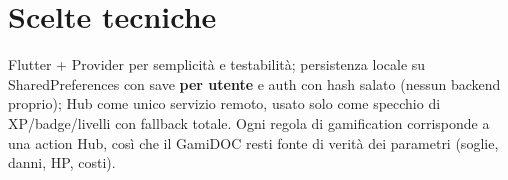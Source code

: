 \section{Scelte tecniche}
Flutter + Provider per semplicit\`a e testabilit\`a; persistenza locale su
SharedPreferences con save \textbf{per utente} e auth con hash salato
(nessun backend proprio); Hub come unico servizio
remoto, usato solo come specchio di XP/badge/livelli con fallback totale.
Ogni regola di gamification corrisponde a una action Hub, cos\`i che il
GamiDOC resti fonte di verit\`a dei parametri (soglie, danni, HP, costi).
